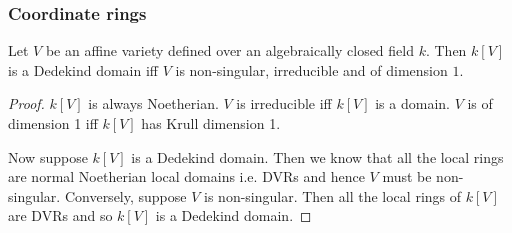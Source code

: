 \documentclass{memoir}
\begin{document}
\subsubsection{Coordinate rings}
\begin{thm}
    Let $V$ be an affine variety defined over an algebraically closed field $k$.
    Then $k[V]$ is a Dedekind domain iff $V$ is non-singular, irreducible and of dimension $1$.
\end{thm}
\begin{proof}
    $k[V]$ is always Noetherian.
    $V$ is irreducible iff $k[V]$ is a domain.
    $V$ is of dimension 1 iff $k[V]$ has Krull dimension 1.

    Now suppose $k[V]$ is a Dedekind domain. Then we know that all the local rings are normal Noetherian local domains  i.e. DVRs and hence $V$ must be non-singular.
    Conversely, suppose $V$ is non-singular. Then all the local rings of $k[V]$ are DVRs and so $k[V]$ is a Dedekind domain.
\end{proof}
\end{document}

